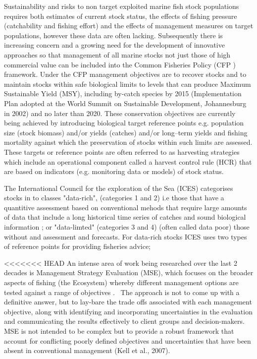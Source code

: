 \documentclass[preprint,12pt]{elsarticle}
\begin{document}
Sustainability and risks to non target exploited marine fish stock populations requires both estimates of current stock status, the effects of fishing pressure (catchability and fishing effort) and the effects of management measures on target populations, however these data are often lacking.  Subsequently there is increasing concern and a growing need for the development of innovative approaches so that management of all marine stocks not just those of high commercial value can be included into the Common Fisheries Policy (CFP \cite{EU 2013}) framework. Under the CFP management objectives are to recover stocks and to maintain stocks within safe biological limits to levels that can produce Maximum Sustainable Yield (MSY), including by-catch species by 2015 (Implementation Plan adopted at the World Summit on Sustainable Development, Johannesburg in 2002) and no later than 2020. These conservation objectives are currently being achieved by introducing biological target reference points e.g. population size (stock biomass) and/or yields (catches) and/or long–term yields and fishing mortality against which the preservation of stocks within such limits are assessed. These targets or reference points are often referred to as harvesting strategies which include an operational component called a harvest control rule (HCR) that are based on indicators (e.g. monitoring data or models) of stock status. 

The International Council for the exploration of the Sea (ICES) categorises stocks in to classes "data-rich", (categories 1 and 2) i.e those that have a quantitive assessment based on conventional mehods that require large amounts of data that include a long historical time series of catches and sound biological information \cite{Bentley, 2015}; or "data-limted" \cite{Costello et al 2015}(categories 3 and 4) (often called data poor) those without and assessment and forecasts. For data-rich stocks ICES uses two types of reference points for providing fisheries advice; 

<<<<<<< HEAD
An intense area of work being researched over the last 2 decades is Management Strategy Evaluation (MSE), which focuses on the broader aspects of fishing (the Ecosystem) whereby different management options are tested against a range of objectives \cite{kell2007flr}.  The approach is not to come up with a definitive answer, but to lay-bare the trade offs associated with each management objective, along with identifying and incorporating uncertainties in the evaluation and communicating the results effectively to client groups and decision-makers. MSE is not intended to be complex but to provide a robust framework that account for conflicting poorly defined objectives and uncertainties that have been absent in conventional management (Kell et al., 2007).  
\end{document}
